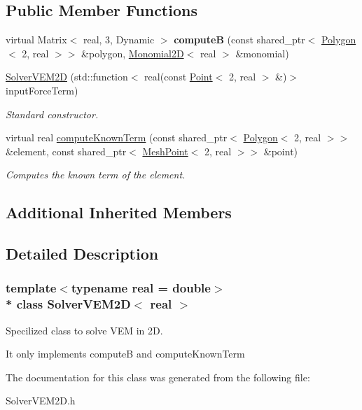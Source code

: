 \subsection*{Public Member Functions}
\begin{DoxyCompactItemize}
\item 
virtual Matrix$<$ real, 3, Dynamic $>$ {\bfseries computeB} (const shared\+\_\+ptr$<$ \hyperlink{class_polygon}{Polygon}$<$ 2, real $>$$>$ \&polygon, \hyperlink{class_monomials}{Monomial2D}$<$ real $>$ \&monomial)\hypertarget{class_solver_v_e_m2_d_a047d81b5eda82278be3a2f835dce8845}{}\label{class_solver_v_e_m2_d_a047d81b5eda82278be3a2f835dce8845}

\item 
\hyperlink{class_solver_v_e_m2_d_aaf184f7a8c8d71699aa94cf9f2816e47}{Solver\+V\+E\+M2D} (std\+::function$<$ real(const \hyperlink{class_point}{Point}$<$ 2, real $>$ \&)$>$ input\+Force\+Term)\hypertarget{class_solver_v_e_m2_d_aaf184f7a8c8d71699aa94cf9f2816e47}{}\label{class_solver_v_e_m2_d_aaf184f7a8c8d71699aa94cf9f2816e47}

\begin{DoxyCompactList}\small\item\em Standard constructor. \end{DoxyCompactList}\item 
virtual real \hyperlink{class_solver_v_e_m2_d_a718d3ee9a896d30ee4cbe8a63adf5605}{compute\+Known\+Term} (const shared\+\_\+ptr$<$ \hyperlink{class_polygon}{Polygon}$<$ 2, real $>$$>$ \&element, const shared\+\_\+ptr$<$ \hyperlink{class_mesh_point}{Mesh\+Point}$<$ 2, real $>$$>$ \&point)\hypertarget{class_solver_v_e_m2_d_a718d3ee9a896d30ee4cbe8a63adf5605}{}\label{class_solver_v_e_m2_d_a718d3ee9a896d30ee4cbe8a63adf5605}

\begin{DoxyCompactList}\small\item\em Computes the known term of the element. \end{DoxyCompactList}\end{DoxyCompactItemize}
\subsection*{Additional Inherited Members}


\subsection{Detailed Description}
\subsubsection*{template$<$typename real = double$>$\\*
class Solver\+V\+E\+M2\+D$<$ real $>$}

Specilized class to solve V\+EM in 2D. 

It only implements computeB and compute\+Known\+Term 

The documentation for this class was generated from the following file\+:\begin{DoxyCompactItemize}
\item 
Solver\+V\+E\+M2\+D.\+h\end{DoxyCompactItemize}
